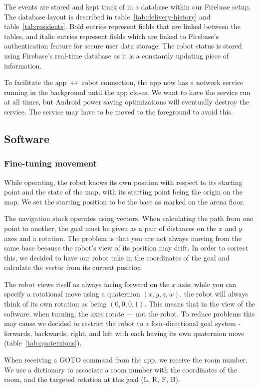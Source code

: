 \documentclass{article}
\begin{document}
 The events are stored and kept track of in a database within our Firebase setup. The database layout is described in table~\ref{tab:delivery-history} and table~\ref{tab:residents}. Bold entries represent fields that are linked between the tables, and italic entries represent fields which are linked to Firebase's authentication feature for secure user data storage. The robot status is stored using Firebase's real-time database as it is a constantly updating piece of information. 

To facilitate the app $\leftrightarrow$ robot connection, the app now has a network service running in the background until the app closes. We want to have the service run at all times, but Android power saving optimizations will eventually destroy the service. The service may have to be moved to the foreground to avoid this. 
\subsection{Software}
\subsubsection{Fine-tuning movement}
While operating, the robot knows its own position with respect to its starting point and the state of the map, with its starting point being the origin on the map. We set the starting position to be the base as marked on the arena floor. 

The navigation stack operates using vectors. When calculating the path from one point to another, the goal must be given as a pair of distances on the $x$ and $y$ axes and a rotation. The problem is that you are not always moving from the same base because the robot's view of its position may drift. In order to correct this, we decided to have our robot take in the coordinates of the goal and calculate the vector from its current position.

The robot views itself as always facing forward on the $x$ axis: while you can specify a rotational move using a quaternion $(x,y,z,w)$, the robot will always think of its own rotation as being $(0,0,0,1)$. This means that in the view of the software, when turning, the axes rotate --- not the robot. To reduce problems this may cause we decided to restrict the robot to a four-directional goal system - forwards, backwards, right, and left with each having its own quaternion move (table~\ref{tab:quaternions}).

When receiving a GOTO command from the app, we receive the room number. We use a dictionary to associate a room number with the coordinates of the room, and the targeted rotation at this goal (L, R, F, B).
\end{document}
